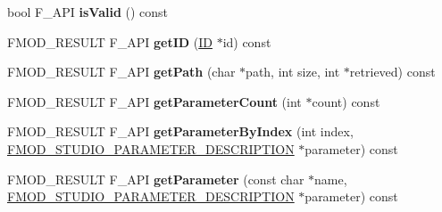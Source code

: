 \begin{DoxyCompactItemize}
\item 
\hypertarget{class_f_m_o_d_1_1_studio_1_1_event_description_a72020ed403ae0b06360204b3b177006b}{bool F\+\_\+\+A\+P\+I {\bfseries is\+Valid} () const }\label{class_f_m_o_d_1_1_studio_1_1_event_description_a72020ed403ae0b06360204b3b177006b}

\item 
\hypertarget{class_f_m_o_d_1_1_studio_1_1_event_description_a522c46ea2d6c105db4447fe77f6c2408}{F\+M\+O\+D\+\_\+\+R\+E\+S\+U\+L\+T F\+\_\+\+A\+P\+I {\bfseries get\+I\+D} (\hyperlink{struct_f_m_o_d___g_u_i_d}{I\+D} $\ast$id) const }\label{class_f_m_o_d_1_1_studio_1_1_event_description_a522c46ea2d6c105db4447fe77f6c2408}

\item 
\hypertarget{class_f_m_o_d_1_1_studio_1_1_event_description_a2025a5aa3922c17934233fcebcbca54a}{F\+M\+O\+D\+\_\+\+R\+E\+S\+U\+L\+T F\+\_\+\+A\+P\+I {\bfseries get\+Path} (char $\ast$path, int size, int $\ast$retrieved) const }\label{class_f_m_o_d_1_1_studio_1_1_event_description_a2025a5aa3922c17934233fcebcbca54a}

\item 
\hypertarget{class_f_m_o_d_1_1_studio_1_1_event_description_a161dca6c8a54e93d1b8d557c899b1fab}{F\+M\+O\+D\+\_\+\+R\+E\+S\+U\+L\+T F\+\_\+\+A\+P\+I {\bfseries get\+Parameter\+Count} (int $\ast$count) const }\label{class_f_m_o_d_1_1_studio_1_1_event_description_a161dca6c8a54e93d1b8d557c899b1fab}

\item 
\hypertarget{class_f_m_o_d_1_1_studio_1_1_event_description_a841d1757556ad10e98aa524f8f5da494}{F\+M\+O\+D\+\_\+\+R\+E\+S\+U\+L\+T F\+\_\+\+A\+P\+I {\bfseries get\+Parameter\+By\+Index} (int index, \hyperlink{struct_f_m_o_d___s_t_u_d_i_o___p_a_r_a_m_e_t_e_r___d_e_s_c_r_i_p_t_i_o_n}{F\+M\+O\+D\+\_\+\+S\+T\+U\+D\+I\+O\+\_\+\+P\+A\+R\+A\+M\+E\+T\+E\+R\+\_\+\+D\+E\+S\+C\+R\+I\+P\+T\+I\+O\+N} $\ast$parameter) const }\label{class_f_m_o_d_1_1_studio_1_1_event_description_a841d1757556ad10e98aa524f8f5da494}

\item 
\hypertarget{class_f_m_o_d_1_1_studio_1_1_event_description_ab3ca17faca50424a420b30562aedaff1}{F\+M\+O\+D\+\_\+\+R\+E\+S\+U\+L\+T F\+\_\+\+A\+P\+I {\bfseries get\+Parameter} (const char $\ast$name, \hyperlink{struct_f_m_o_d___s_t_u_d_i_o___p_a_r_a_m_e_t_e_r___d_e_s_c_r_i_p_t_i_o_n}{F\+M\+O\+D\+\_\+\+S\+T\+U\+D\+I\+O\+\_\+\+P\+A\+R\+A\+M\+E\+T\+E\+R\+\_\+\+D\+E\+S\+C\+R\+I\+P\+T\+I\+O\+N} $\ast$parameter) const }\label{class_f_m_o_d_1_1_studio_1_1_event_description_ab3ca17faca50424a420b30562aedaff1}


\end{DoxyCompactItemize}
